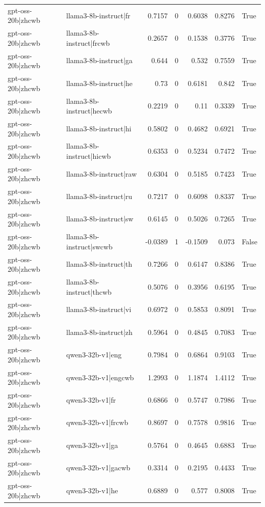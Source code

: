 \begin{table}
\begin{tabular}{l l r r r r l}
gpt-oss-20b|zhcwb & llama3-8b-instruct|fr & 0.7157 & 0 & 0.6038 & 0.8276 & True \\
gpt-oss-20b|zhcwb & llama3-8b-instruct|frcwb & 0.2657 & 0 & 0.1538 & 0.3776 & True \\
gpt-oss-20b|zhcwb & llama3-8b-instruct|ga & 0.644 & 0 & 0.532 & 0.7559 & True \\
gpt-oss-20b|zhcwb & llama3-8b-instruct|he & 0.73 & 0 & 0.6181 & 0.842 & True \\
gpt-oss-20b|zhcwb & llama3-8b-instruct|hecwb & 0.2219 & 0 & 0.11 & 0.3339 & True \\
gpt-oss-20b|zhcwb & llama3-8b-instruct|hi & 0.5802 & 0 & 0.4682 & 0.6921 & True \\
gpt-oss-20b|zhcwb & llama3-8b-instruct|hicwb & 0.6353 & 0 & 0.5234 & 0.7472 & True \\
gpt-oss-20b|zhcwb & llama3-8b-instruct|raw & 0.6304 & 0 & 0.5185 & 0.7423 & True \\
gpt-oss-20b|zhcwb & llama3-8b-instruct|ru & 0.7217 & 0 & 0.6098 & 0.8337 & True \\
gpt-oss-20b|zhcwb & llama3-8b-instruct|sw & 0.6145 & 0 & 0.5026 & 0.7265 & True \\
gpt-oss-20b|zhcwb & llama3-8b-instruct|swcwb & -0.0389 & 1 & -0.1509 & 0.073 & False \\
gpt-oss-20b|zhcwb & llama3-8b-instruct|th & 0.7266 & 0 & 0.6147 & 0.8386 & True \\
gpt-oss-20b|zhcwb & llama3-8b-instruct|thcwb & 0.5076 & 0 & 0.3956 & 0.6195 & True \\
gpt-oss-20b|zhcwb & llama3-8b-instruct|vi & 0.6972 & 0 & 0.5853 & 0.8091 & True \\
gpt-oss-20b|zhcwb & llama3-8b-instruct|zh & 0.5964 & 0 & 0.4845 & 0.7083 & True \\
gpt-oss-20b|zhcwb & qwen3-32b-v1|eng & 0.7984 & 0 & 0.6864 & 0.9103 & True \\
gpt-oss-20b|zhcwb & qwen3-32b-v1|engcwb & 1.2993 & 0 & 1.1874 & 1.4112 & True \\
gpt-oss-20b|zhcwb & qwen3-32b-v1|fr & 0.6866 & 0 & 0.5747 & 0.7986 & True \\
gpt-oss-20b|zhcwb & qwen3-32b-v1|frcwb & 0.8697 & 0 & 0.7578 & 0.9816 & True \\
gpt-oss-20b|zhcwb & qwen3-32b-v1|ga & 0.5764 & 0 & 0.4645 & 0.6883 & True \\
gpt-oss-20b|zhcwb & qwen3-32b-v1|gacwb & 0.3314 & 0 & 0.2195 & 0.4433 & True \\
gpt-oss-20b|zhcwb & qwen3-32b-v1|he & 0.6889 & 0 & 0.577 & 0.8008 & True \\

\end{tabular}
\end{table}
